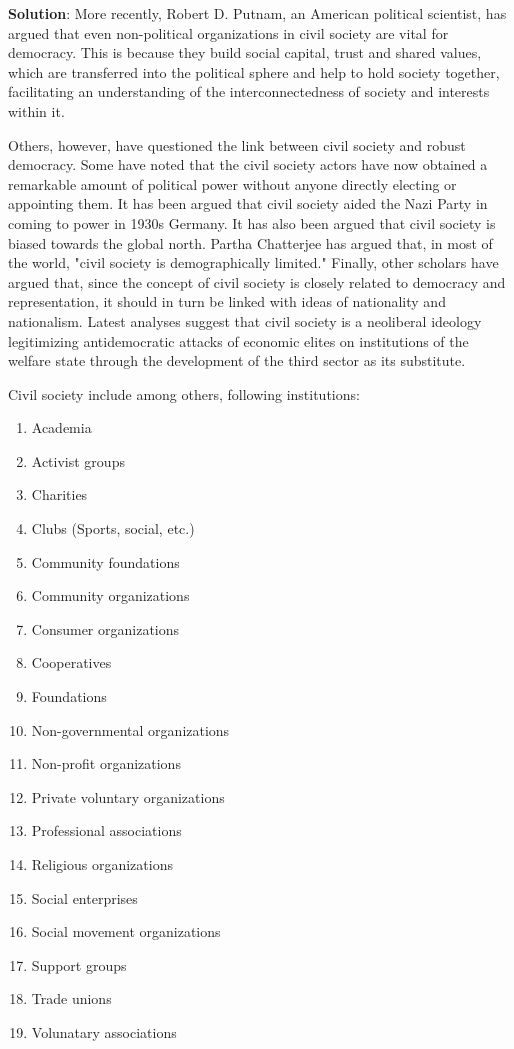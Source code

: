 \documentclass[
  openany]{book}
\newenvironment{solution}{ {\bfseries Solution}:}{}
\begin{document}
\begin{questions}
\begin{solution}
More recently, Robert D. Putnam, an American political scientist, has argued that even non-political organizations in civil society are vital for democracy. This is because they build social capital, trust and shared values, which are transferred into the political sphere and help to hold society together, facilitating an understanding of the interconnectedness of society and interests within it.

Others, however, have questioned the link between civil society and robust democracy. Some have noted that the civil society actors have now obtained a remarkable amount of political power without anyone directly electing or appointing them. It has been argued that civil society aided the Nazi Party in coming to power in 1930s Germany. It has also been argued that civil society is biased towards the global north. Partha Chatterjee has argued that, in most of the world, "civil society is demographically limited." Finally, other scholars have argued that, since the concept of civil society is closely related to democracy and representation, it should in turn be linked with ideas of nationality and nationalism. Latest analyses suggest that civil society is a neoliberal ideology legitimizing antidemocratic attacks of economic elites on institutions of the welfare state through the development of the third sector as its substitute.

Civil society include among others, following institutions:

\begin{enumerate}
\item Academia
\item Activist groups
\item Charities
\item Clubs (Sports, social, etc.)
\item Community foundations
\item Community organizations
\item Consumer organizations
\item Cooperatives
\item Foundations
\item Non-governmental organizations
\item Non-profit organizations
\item Private voluntary organizations
\item Professional associations
\item Religious organizations
\item Social enterprises
\item Social movement organizations
\item Support groups
\item Trade unions
\item Volunatary associations
\end{enumerate}


\end{solution}
\end{questions}
\end{document}

